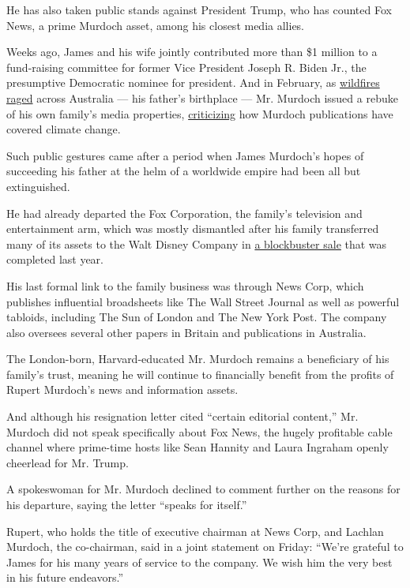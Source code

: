He has also taken public stands against President Trump, who has counted
Fox News, a prime Murdoch asset, among his closest media allies.

Weeks ago, James and his wife jointly contributed more than \$1 million
to a fund-raising committee for former Vice President Joseph R. Biden
Jr., the presumptive Democratic nominee for president. And in February,
as
\href{https://www.nytimes3xbfgragh.onion/2020/01/21/world/australia/fires-size-climate.html}{wildfires
raged} across Australia --- his father's birthplace --- Mr. Murdoch
issued a rebuke of his own family's media properties,
\href{https://www.nytimes3xbfgragh.onion/2020/02/12/business/dealbook/james-murdoch-environment.html}{criticizing}
how Murdoch publications have covered climate change.

Such public gestures came after a period when James Murdoch's hopes of
succeeding his father at the helm of a worldwide empire had been all but
extinguished.

He had already departed the Fox Corporation, the family's television and
entertainment arm, which was mostly dismantled after his family
transferred many of its assets to the Walt Disney Company in
\href{https://www.nytimes3xbfgragh.onion/2018/07/27/business/media/disney-fox-merger-vote.html}{a
blockbuster sale} that was completed last year.

His last formal link to the family business was through News Corp, which
publishes influential broadsheets like The Wall Street Journal as well
as powerful tabloids, including The Sun of London and The New York Post.
The company also oversees several other papers in Britain and
publications in Australia.

The London-born, Harvard-educated Mr. Murdoch remains a beneficiary of
his family's trust, meaning he will continue to financially benefit from
the profits of Rupert Murdoch's news and information assets.

And although his resignation letter cited ``certain editorial content,''
Mr. Murdoch did not speak specifically about Fox News, the hugely
profitable cable channel where prime-time hosts like Sean Hannity and
Laura Ingraham openly cheerlead for Mr. Trump.

A spokeswoman for Mr. Murdoch declined to comment further on the reasons
for his departure, saying the letter ``speaks for itself.''

Rupert, who holds the title of executive chairman at News Corp, and
Lachlan Murdoch, the co-chairman, said in a joint statement on Friday:
``We're grateful to James for his many years of service to the company.
We wish him the very best in his future endeavors.''

